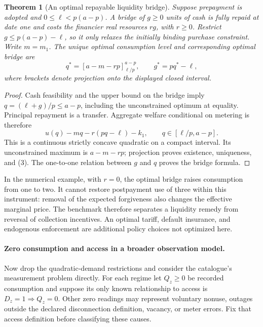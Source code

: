 \documentclass[11pt]{article}
\newtheorem{theorem}{Theorem}
\theoremstyle{definition}
\begin{document}
\begin{theorem}[An optimal repayable liquidity bridge]
Suppose prepayment is adopted and $0\leq\ell<p(a-p)$. A bridge of $g\geq0$ units of cash is fully repaid at date one and costs the financier real resources $rg$, with $r\geq0$. Restrict $g\leq p(a-p)-\ell$, so it only relaxes the initially binding purchase constraint. Write $m=m_1$. The unique optimal consumption level and corresponding optimal bridge are
\[
 q^*=\left[a-m-rp\right]_{\ell/p}^{a-p},
 \qquad g^*=pq^*-\ell,
 \tag{3}
\]
where brackets denote projection onto the displayed closed interval.
\end{theorem}
\begin{proof}
Cash feasibility and the upper bound on the bridge imply $q=(\ell+g)/p\leq a-p$, including the unconstrained optimum at equality. Principal repayment is a transfer. Aggregate welfare conditional on metering is therefore
\[
 u(q)-mq-r(pq-\ell)-k_1,
 \qquad q\in[\ell/p,a-p].
\]
This is a continuous strictly concave quadratic on a compact interval. Its unconstrained maximum is $a-m-rp$; projection proves existence, uniqueness, and (3). The one-to-one relation between $g$ and $q$ proves the bridge formula.
\end{proof}

In the numerical example, with $r=0$, the optimal bridge raises consumption from one to two. It cannot restore postpayment use of three within this instrument: removal of the expected forgiveness also changes the effective marginal price. The benchmark therefore separates a liquidity remedy from reversal of collection incentives. An optimal tariff, default insurance, and endogenous enforcement are additional policy choices not optimized here.

\paragraph{Zero consumption and access in a broader observation model.}
Now drop the quadratic-demand restrictions and consider the catalogue's measurement problem directly. For each regime let $Q_z\geq0$ be recorded consumption and suppose its only known relationship to access is $D_z=1\Rightarrow Q_z=0$. Other zero readings may represent voluntary nonuse, outages outside the declared disconnection definition, vacancy, or meter errors. Fix that access definition before classifying these causes.
\end{document}
